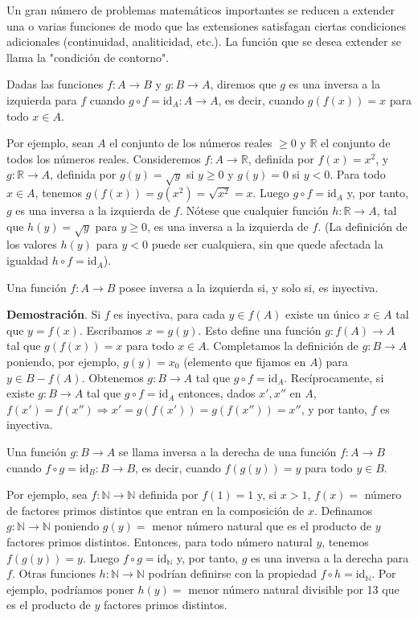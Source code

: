 Un gran número de problemas matemáticos importantes se reducen a extender una o varias funciones de modo que las extensiones satisfagan ciertas condiciones adicionales (continuidad, analiticidad, etc.). La función que se desea extender se llama la "condición de contorno".

Dadas las funciones \(f: A \to B\) y \(g: B \to A\), diremos que \(g\) es una inversa a la izquierda para \(f\) cuando \(g \circ f = \text{id}_A: A \to A\), es decir, cuando \(g(f(x)) = x\) para todo \(x \in A\).

Por ejemplo, sean \(A\) el conjunto de los números reales \(\geq 0\) y \(\mathbb{R}\) el conjunto de todos los números reales. Consideremos \(f: A \to \mathbb{R}\), definida por \(f(x) = x^2\), y \(g: \mathbb{R} \to A\), definida por \(g(y) = \sqrt{y}\) si \(y \geq 0\) y \(g(y) = 0\) si \(y < 0\). Para todo \(x \in A\), tenemos \(g(f(x)) = g(x^2) = \sqrt{x^2} = x\). Luego \(g \circ f = \text{id}_A\) y, por tanto, \(g\) es una inversa a la izquierda de \(f\). Nótese que cualquier función \(h: \mathbb{R} \to A\), tal que \(h(y) = \sqrt{y}\) para \(y \geq 0\), es una inversa a la izquierda de \(f\). (La definición de los valores \(h(y)\) para \(y < 0\) puede ser cualquiera, sin que quede afectada la igualdad \(h \circ f = \text{id}_A\)).

Una función \(f: A \to B\) posee inversa a la izquierda si, y solo si, es inyectiva.

\textbf{Demostración}. Si \(f\) es inyectiva, para cada \(y \in f(A)\) existe un único \(x \in A\) tal que \(y = f(x)\). Escribamos \(x = g(y)\). Esto define una función \(g: f(A) \to A\) tal que \(g(f(x)) = x\) para todo \(x \in A\). Completamos la definición de \(g: B \to A\) poniendo, por ejemplo, \(g(y) = x_0\) (elemento que fijamos en \(A\)) para \(y \in B - f(A)\). Obtenemos \(g: B \to A\) tal que \(g \circ f = \text{id}_A\). Recíprocamente, si existe \(g: B \to A\) tal que \(g \circ f = \text{id}_A\) entonces, dados \(x', x''\) en \(A\), \(f(x') = f(x'') \Rightarrow x' = g(f(x')) = g(f(x'')) = x''\), y por tanto, \(f\) es inyectiva.

Una función \(g: B \to A\) se llama inversa a la derecha de una función \(f: A \to B\) cuando \(f \circ g = \text{id}_B: B \to B\), es decir, cuando \(f(g(y)) = y\) para todo \(y \in B\).

Por ejemplo, sea \(f: \mathbb{N} \to \mathbb{N}\) definida por \(f(1) = 1\) y, si \(x > 1\), \(f(x) =\) número de factores primos distintos que entran en la composición de \(x\). Definamos \(g: \mathbb{N} \to \mathbb{N}\) poniendo \(g(y) =\) menor número natural que es el producto de \(y\) factores primos distintos. Entonces, para todo número natural \(y\), tenemos \(f(g(y)) = y\). Luego \(f \circ g = \text{id}_{\mathbb{N}}\) y, por tanto, \(g\) es una inversa a la derecha para \(f\). Otras funciones \(h: \mathbb{N} \to \mathbb{N}\) podrían definirse con la propiedad \(f \circ h = \text{id}_{\mathbb{N}}\). Por ejemplo, podríamos poner \(h(y) =\) menor número natural divisible por 13 que es el producto de \(y\) factores primos distintos.

